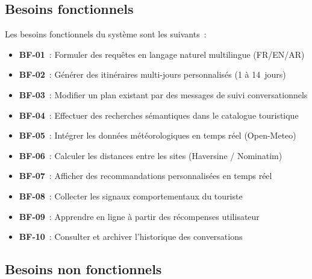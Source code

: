 \subsection{Besoins fonctionnels}

Les besoins fonctionnels du système sont les suivants~:
\begin{itemize}
    \item \textbf{BF-01}~: Formuler des requêtes en langage naturel multilingue (FR/EN/AR)
    \item \textbf{BF-02}~: Générer des itinéraires multi-jours personnalisés (1 à 14~jours)
    \item \textbf{BF-03}~: Modifier un plan existant par des messages de suivi conversationnels
    \item \textbf{BF-04}~: Effectuer des recherches sémantiques dans le catalogue touristique
    \item \textbf{BF-05}~: Intégrer les données météorologiques en temps réel (Open-Meteo)
    \item \textbf{BF-06}~: Calculer les distances entre les sites (Haversine / Nominatim)
    \item \textbf{BF-07}~: Afficher des recommandations personnalisées en temps réel
    \item \textbf{BF-08}~: Collecter les signaux comportementaux du touriste
    \item \textbf{BF-09}~: Apprendre en ligne à partir des récompenses utilisateur
    \item \textbf{BF-10}~: Consulter et archiver l'historique des conversations
\end{itemize}

\subsection{Besoins non fonctionnels}

